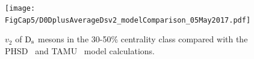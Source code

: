 \begin{figure}[!t]
\begin{center}
\texttt{[image: FigCap5/D0DplusAverageDsv2\_modelComparison\_05May2017.pdf]}
\caption{$v_2$ of ${\rm D_s}$ mesons in the 30-50\% centrality class compared with the PHSD~\cite{Song:2015ykw}  and TAMU~\cite{He:2014cla} model calculations.}
\label{fig:v2_models} 
\end{center}
\end{figure}


